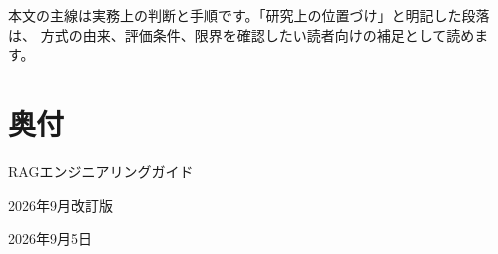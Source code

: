 \documentclass[a4paper,11pt,openany]{ltjsbook}
\begin{document}
本文の主線は実務上の判断と手順です。「研究上の位置づけ」と明記した段落は、
方式の由来、評価条件、限界を確認したい読者向けの補足として読めます。

\tableofcontents
\mainmatter
{}
\backmatter

\cleardoublepage
\printindex
\chapter*{奥付}
\begin{description}[leftmargin=7em,labelwidth=6em]
  \item[書名] RAGエンジニアリングガイド
  \item[版] 2026年9月改訂版
  \item[改訂日] 2026年9月5日
\end{description}
\end{document}
